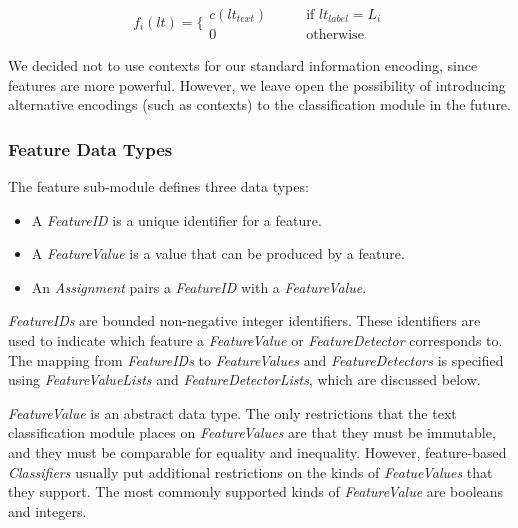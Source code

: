 \documentclass[12pt]{article}
\begin{document}
      \begin{equation}
        f_i(lt) = \bigg\{ \begin{array}{cl} 
                 c(lt_{text}) & \qquad \textrm{if } lt_{label}=L_i \\
                 0 & \qquad \textrm{otherwise} \end{array}
      \end{equation}

      We decided not to use contexts for our standard information
      encoding, since features are more powerful.  However, we leave
      open the possibility of introducing alternative encodings (such
      as contexts) to the classification module in the future.

    \subsubsection{Feature Data Types}

      The feature sub-module defines three data types:

      \begin{itemize}

        \item A \textit{FeatureID} is a unique identifier for a feature.

        \item A \textit{FeatureValue} is a value that can be produced
        by a feature.

        \item An \textit{Assignment} pairs a \textit{FeatureID} with a
        \textit{FeatureValue}.
      \end{itemize}

      \textit{FeatureIDs} are bounded non-negative integer
      identifiers.  These identifiers are used to indicate which
      feature a \textit{FeatureValue} or \textit{FeatureDetector}
      corresponds to.  The mapping from \textit{FeatureIDs} to
      \textit{FeatureValues} and \textit{FeatureDetectors} is
      specified using \textit{FeatureValueLists} and
      \textit{FeatureDetectorLists}, which are discussed below.

      \textit{FeatureValue} is an abstract data type.  The only
      restrictions that the text classification module places on
      \textit{FeatureValues} are that they must be immutable, and they
      must be comparable for equality and inequality.  However,
      feature-based \textit{Classifiers} usually put additional
      restrictions on the kinds of \textit{FeatueValues} that they
      support.  The most commonly supported kinds of
      \textit{FeatureValue} are booleans and integers.
\end{document}
